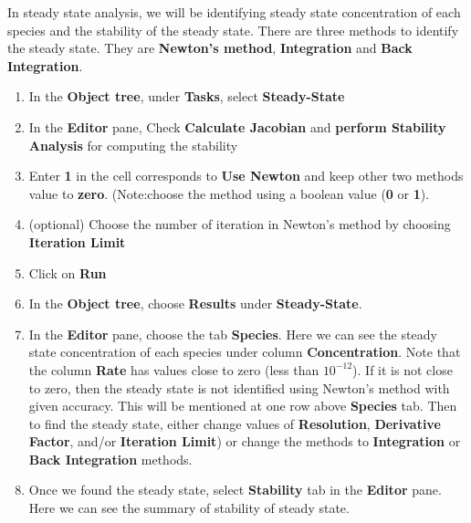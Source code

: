 \documentclass[10pt]{article}
\theoremstyle{definition}
\theoremstyle{remark}
\begin{document}
	In steady state analysis, we will be identifying steady state concentration of each species and the stability of the steady state. There are three methods to identify the steady state. They are \textbf{Newton's method}, \textbf{Integration} and \textbf{Back Integration}. 
	\begin{enumerate}[start=1]\def\makelabel{\textbf{Step}~}
		\item In the \textbf{Object tree}, under \textbf{Tasks}, select \textbf{Steady-State}
		\item In the \textbf{Editor} pane, Check \textbf{Calculate Jacobian} and \textbf{perform Stability Analysis} for computing the stability
		\item Enter \textbf{1} in the cell corresponds to \textbf{Use Newton} and keep other two methods value to \textbf{zero}. (Note:choose the method using a boolean value (\textbf{0} or \textbf{1}).
		\item (optional) Choose the number of iteration in Newton's method by choosing \textbf{Iteration Limit}
		\item Click on \textbf{Run}
		\item In the \textbf{Object tree}, choose \textbf{Results} under \textbf{Steady-State}.
		\item In the \textbf{Editor} pane, choose the tab \textbf{Species}. Here we can see the steady state concentration of each species under column \textbf{Concentration}. Note that the column \textbf{Rate} has values close to zero (less than $10^{-12}$). If it is not close to zero, then the steady state is not identified using Newton's method with given accuracy. This will be mentioned at one row above \textbf{Species} tab. Then to find the steady state, either change values of \textbf{Resolution}, \textbf{Derivative Factor}, and/or \textbf{Iteration Limit}) or change the methods to \textbf{Integration} or \textbf{Back Integration} methods.
		\item Once we found the steady state, select \textbf{Stability} tab in the \textbf{Editor} pane. Here we can see the summary of stability of steady state.
	\end{enumerate}
	
\end{document}
